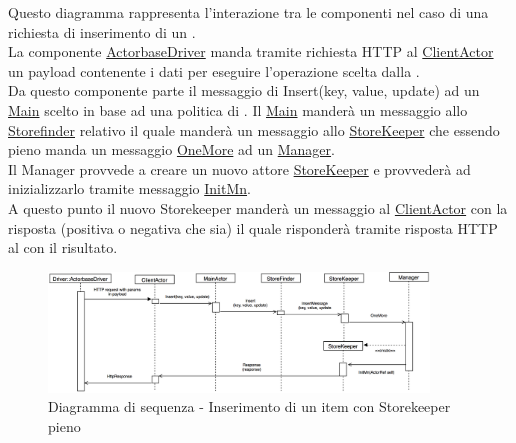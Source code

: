 \documentclass{scalatekids-article}
\begin{document}
Questo diagramma rappresenta l'interazione tra le componenti nel caso di una richiesta di inserimento di un .\\
La componente \hyperref[sec:actorbase::driver::ActorbaseDriver]{ActorbaseDriver}
manda tramite richiesta HTTP al \hyperref[sec:actorbase::actorsystem::actors::clientactor::ClientActor]{ClientActor}
un payload contenente i dati per eseguire l'operazione scelta dalla .\\
Da questo componente parte il messaggio di Insert(key, value, update) ad un \hyperref[sec:actorbase::actorsystem::actors::main::Main]{Main} scelto in base
ad una politica di .
Il \hyperref[sec:actorbase::actorsystem::actors::main::Main]{Main} manderà un messaggio allo \hyperref[sec:actorbase::actorsystem::actors::storefinder::Storefinder]{Storefinder} relativo il quale manderà
un messaggio allo \hyperref[sec:actorbase::actorsystem::actors::storekeeper::StoreKeeper]{StoreKeeper} che essendo pieno manda un
messaggio \hyperref[sec:actorbase::actorsystem::messages::managermessages::OneMore]{OneMore} ad un
\hyperref[sec:actorbase::actorsystem::actors::manager::Manager]{Manager}.\\
Il Manager provvede a creare un nuovo attore \hyperref[sec:actorbase::actorsystem::actors::storekeeper::StoreKeeper]{StoreKeeper} e provvederà ad inizializzarlo tramite messaggio \hyperref[sec:actorbase::actorsystem::messages::storekeepermessages::InitMn]{InitMn}.\\
A questo punto il nuovo Storekeeper manderà un messaggio al \hyperref[sec:actorbase::actorsystem::actors::clientactor::ClientActor]{ClientActor} con
la risposta (positiva o negativa che sia) il quale risponderà tramite risposta HTTP al  con il risultato.
\begin{figure}[H]
  \begin{center}
    \includegraphics[width=0.9\textwidth, keepaspectratio]{img/diagrammiSequenza/esempioInsertFull.png}
    \caption{Diagramma di sequenza - Inserimento di un item con Storekeeper pieno}
  \end{center}
\end{figure}
\end{document}
